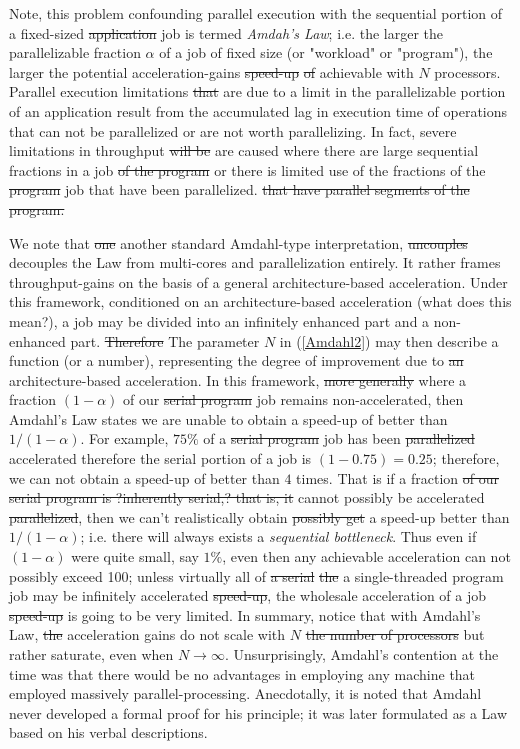 \documentclass[10pt]{article}[draft]
\begin{document}
Note, this problem  confounding parallel execution with the sequential portion of a fixed-sized \st{application} job  is termed \emph{Amdah's Law}; i.e. the larger the parallelizable fraction $\alpha$ of a job  of fixed size  (or "workload" or  "program"), the larger the potential acceleration-gains \st{speed-up} \st{of} achievable with $N$ processors. Parallel execution limitations \st{that} are due to a limit in the parallelizable portion of an application result from the accumulated lag in execution time of operations that can not be parallelized or are not worth parallelizing.  In fact, severe limitations in throughput \st{will be} are caused where there are large sequential fractions in a job \st{of the program} or there is limited use of the fractions of the  \st{program} job that have been parallelized. \st{that have  parallel segments of the program.}  

We note that \st{one} another standard Amdahl-type interpretation, \st{uncouples} decouples the Law from multi-cores and parallelization entirely. It rather frames throughput-gains on the basis of a general architecture-based acceleration. Under this framework, conditioned on an architecture-based acceleration (what does this mean?), a job may be divided into an infinitely enhanced part  and a non-enhanced part. \st{Therefore} The parameter $N$ in (\ref{Amdahl2}) may then describe a function (or a number), representing the degree of improvement due to \st{an} architecture-based acceleration. In this framework, \st{more generally} where a fraction $(1 - \alpha)$ of our \st{serial program} job remains non-accelerated, then Amdahl's Law states we are unable to obtain a speed-up of better than $1/(1 - \alpha)$. For example, $75\%$ of a \st{serial program} job has been \st{parallelized} accelerated therefore the serial portion of a job is $(1 - 0.75) = 0.25$; therefore, we can not obtain a speed-up of better than $4$ times. That is if a fraction \st{of our serial program is ?inherently serial,? that is, it} cannot possibly be accelerated \st{parallelized}, then we can't realistically obtain \st{possibly get} a speed-up better than $1/(1 - \alpha)$; i.e. there will always exists a \emph{sequential bottleneck}. Thus even if $(1 - \alpha)$ were quite small, say $1\%$,  even then any achievable acceleration can not possibly exceed 100; unless virtually all of \st{a serial} \st{the} a single-threaded program job may be infinitely accelerated \st{speed-up}, the wholesale acceleration of a job \st{speed-up} is going to be very limited. In summary, notice that with Amdahl's Law, 
\st{the} acceleration gains do not scale with $N$ \st{the number of processors} but rather saturate, even when $N \rightarrow \infty$. Unsurprisingly, Amdahl's contention at the time was that there would be no advantages in employing any machine that employed massively parallel-processing. Anecdotally, it is noted that Amdahl never developed a formal proof for his principle; it was later formulated as a Law based on his verbal descriptions.
\end{document}
